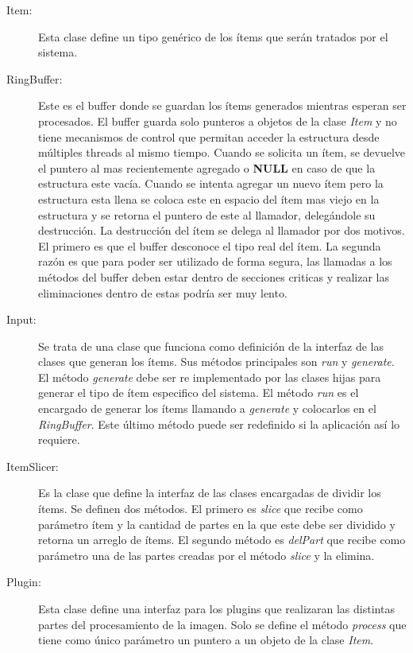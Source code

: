 \begin{description}

\item[Item:] Esta clase define un tipo genérico de los ítems que serán tratados
	por el sistema.

\item[RingBuffer:] Este es el buffer donde se guardan los ítems generados
	mientras esperan ser procesados. El buffer guarda solo punteros a
	objetos de la clase \emph{Item} y no tiene mecanismos de control que
	permitan acceder la estructura desde múltiples threads al mismo tiempo.
	Cuando se solicita un ítem, se devuelve el puntero al mas recientemente
	agregado o \textbf{NULL} en caso de que la estructura este vacía. Cuando
	se intenta agregar un nuevo ítem pero la estructura esta llena se coloca
	este en espacio del ítem mas viejo en la estructura y se retorna el
	puntero de este al llamador, delegándole su destrucción. La destrucción
	del ítem se delega al llamador por dos motivos. El primero es que el
	buffer desconoce el tipo real del ítem. La segunda razón es que para
	poder ser utilizado de forma segura, las llamadas a los métodos del
	buffer deben estar dentro de secciones criticas y realizar las
	eliminaciones dentro de estas podría ser muy lento.

\item[Input:] Se trata de una clase que funciona como definición de la interfaz
	de las clases que generan los ítems. Sus métodos principales son
	\emph{run} y \emph{generate}. El método \emph{generate} debe ser re
	implementado por las clases hijas para generar el tipo de ítem
	especifico del sistema. El método \emph{run} es el encargado de generar
	los ítems llamando a \emph{generate} y colocarlos en el
	\emph{RingBuffer}. Este último método puede ser redefinido si la
	aplicación así lo requiere.

\item[ItemSlicer:] Es la clase que define la interfaz de las clases encargadas
	de dividir los ítems. Se definen dos métodos. El primero es \emph{slice}
	que recibe como parámetro ítem y la cantidad de partes en la que este
	debe ser dividido y retorna un arreglo de ítems. El segundo método es
	\emph{delPart} que recibe como parámetro una de las partes creadas por
	el método \emph{slice} y la elimina.

\item[Plugin:] Esta clase define una interfaz para los plugins que realizaran
	las distintas partes del procesamiento de la imagen. Solo se define el
	método \emph{process} que tiene como único parámetro un puntero a un
	objeto de la clase \emph{Item}.


\end{description}
